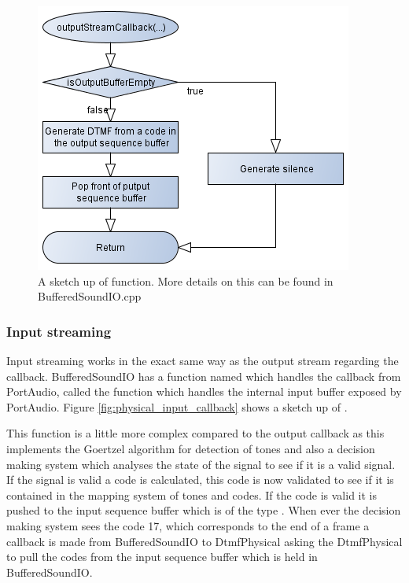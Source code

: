 		\begin{figure}[htb]
			\begin{center}
			\includegraphics[scale=0.7,trim=0 0 0 0]{content/graphics/physical/physical_output_callback.png}%
			\caption{A sketch up of  function. More details on this can be found in BufferedSoundIO.cpp}
			\label{fig:physical_output_callback}
			\end{center}
		\end{figure}
		
		\subsubsection{Input streaming}
		Input streaming works in the exact same way as the output stream regarding the callback. BufferedSoundIO has a function named
		 which handles the callback from PortAudio,  called the 
		function which handles the internal input buffer exposed by PortAudio. Figure \ref{fig:physical_input_callback} shows a sketch up of .
		
		This function is a little more complex compared to the output callback as this implements the Goertzel algorithm for detection of tones and also
		a decision making system which analyses the state of the signal to see if it is a valid signal. If the signal is valid a code is calculated, this
		code is now validated to see if it is contained in the mapping system of tones and codes. If the code is valid it is pushed to the input
		sequence buffer which is of the type . When ever the decision making system sees the code 17,
		which corresponds to the end of a frame a callback is made from BufferedSoundIO to DtmfPhysical asking the DtmfPhysical to pull the codes from
		the input sequence buffer which is held in BufferedSoundIO.
		
